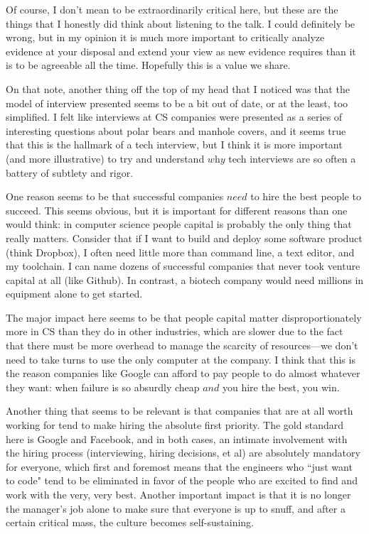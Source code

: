 \documentclass[a4paper]{article}
\begin{document}
Of course, I don't mean to be extraordinarily critical here, but these are the things that I honestly did think about listening to the talk. I could definitely be wrong, but in my opinion it is much more important to critically analyze evidence at your disposal and extend your view as new evidence requires than it is to be agreeable all the time. Hopefully this is a value we share.

On that note, another thing off the top of my head that I noticed was that the model of interview presented seems to be a bit out of date, or at the least, too simplified. I felt like interviews at CS companies were presented as a series of interesting questions about polar bears and manhole covers, and it seems true that this is the hallmark of a tech interview, but I think it is more important (and more illustrative) to try and understand $\textit{why}$ tech interviews are so often a battery of subtlety and rigor.

One reason seems to be that successful companies $\textit{need}$ to hire the best people to succeed. This seems obvious, but it is important for different reasons than one would think: in computer science people capital is probably the only thing that really matters. Consider that if I want to build and deploy some software product (think Dropbox), I often need little more than command line, a text editor, and my toolchain. I can name dozens of successful companies that never took venture capital at all (like Github). In contrast, a biotech company would need millions in equipment alone to get started.

The major impact here seems to be that people capital matter disproportionately more in CS than they do in other industries, which are slower due to the fact that there must be more overhead to manage the scarcity of resources---we don't need to take turns to use the only computer at the company. I think that this is the reason companies like Google can afford to pay people to do almost whatever they want: when failure is so absurdly cheap $\textit{and}$ you hire the best, you win.

Another thing that seems to be relevant is that companies that are at all worth working for tend to make hiring the absolute first priority. The gold standard here is Google and Facebook, and in both cases, an intimate involvement with the hiring process (interviewing, hiring decisions, et al) are absolutely mandatory for everyone, which first and foremost means that the engineers who ``just want to code" tend to be eliminated in favor of the people who are excited to find and work with the very, very best. Another important impact is that it is no longer the manager's job alone to make sure that everyone is up to snuff, and after a certain critical mass, the culture becomes self-sustaining.
\end{document}
